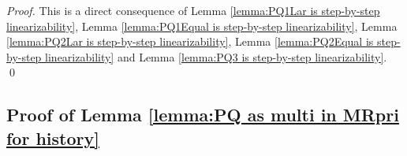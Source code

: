 \PQueueisStepByStepLinearizability*

\begin {proof}
This is a direct consequence of Lemma \ref{lemma:PQ1Lar is step-by-step linearizability}, Lemma \ref{lemma:PQ1Equal is step-by-step linearizability}, Lemma \ref{lemma:PQ2Lar is step-by-step linearizability}, Lemma \ref{lemma:PQ2Equal is step-by-step linearizability} and Lemma \ref{lemma:PQ3 is step-by-step linearizability}. \qed
\end {proof}


\subsection{Proof of Lemma \ref{lemma:PQ as multi in MRpri for history}}

\PQasMultiInMRpriforHistory*

